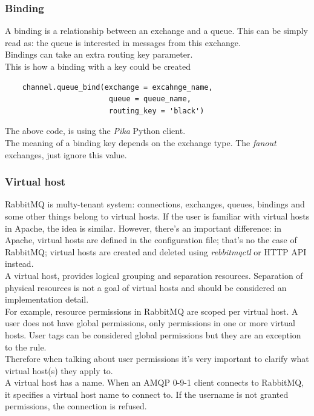 \documentclass[12pt]{article}
\begin{document}
\subsubsection*{Binding}
A binding is a relationship between an exchange and a queue. This can be simply read as: the queue is interested in messages from this exchange.\\
Bindings can take an extra routing key parameter.\\
This is how a binding with a key could be created\\
\begin{lstlisting}
    channel.queue_bind(exchange = excahnge_name,
                        queue = queue_name,
                        routing_key = 'black')
\end{lstlisting}
The above code, is using the \textit{Pika} Python client.\\
The meaning of a binding key depends on the exchange type. The \textit{fanout} exchanges, just ignore this value.

\subsubsection*{Virtual host}
RabbitMQ is multy-tenant system: connections, exchanges, queues, bindings and some other things belong to virtual hosts. If the user is familiar with virtual hosts in Apache, the idea is similar. However, there's an important difference: in Apache, virtual hosts are defined in the configuration file; that's no the case of RabbitMQ; virtual hosts are created and deleted using \textit{rebbitmqctl} or HTTP API instead.\\
A virtual host, provides logical grouping and separation resources. Separation of physical resources is not a goal of virtual hosts and should be considered an implementation detail.\\
For example, resource permissions in RabbitMQ are scoped per virtual host. A user does not have global permissions, only permissions in one or more virtual hosts. User tags can be considered global permissions but they are an exception to the rule.\\
Therefore when talking about user permissions it's very important to clarify what virtual host(s) they apply to.\\
A virtual host has a name. When an AMQP 0-9-1 client connects to RabbitMQ, it specifies a virtual host name to connect to. If the username is not granted permissions, the connection is refused.
\end{document}
